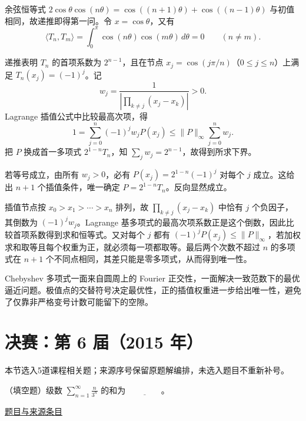 \documentclass[12pt,fontset=fandol]{ctexart}
\begin{document}
\begin{solve}\label{ans:fin05-hi:11}

余弦恒等式
$2\cos\theta\cos(n\theta)=\cos((n+1)\theta)+\cos((n-1)\theta)$
与初值相同，故递推即得第一问。令 $x=\cos\theta$，又有
\[
\langle T_n,T_m\rangle=\int_0^\pi\cos(n\theta)\cos(m\theta)\,d\theta=0
\qquad(n\ne m).
\]

递推表明 $T_n$ 的首项系数为 $2^{n-1}$，且在节点 $x_j=\cos(j\pi/n)$（$0\le j\le n$）上满足 $T_n(x_j)=(-1)^j$。记
\[
w_j=\frac1{\left|\prod_{k\ne j}(x_j-x_k)\right|}>0.
\]
Lagrange 插值公式中比较最高次项，得
\[
1=\sum_{j=0}^n(-1)^jw_jP(x_j)
\le\|P\|_\infty\sum_{j=0}^n w_j.
\]
把 $P$ 换成首一多项式 $2^{1-n}T_n$，知 $\sum_jw_j=2^{n-1}$，故得到所求下界。

若等号成立，由所有 $w_j>0$，必有 $P(x_j)=2^{1-n}(-1)^j$ 对每个 $j$ 成立。这给出 $n+1$ 个插值条件，唯一确定 $P=2^{1-n}T_n$。反向显然成立。

插值节点按 $x_0>x_1>\cdots>x_n$ 排列，故 $\prod_{k\ne j}(x_j-x_k)$ 中恰有 $j$ 个负因子，其倒数为 $(-1)^jw_j$。Lagrange 基多项式的最高次项系数正是这个倒数，因此比较首项系数得到求和恒等式。又对每个 $j$ 都有 $(-1)^jP(x_j)\le\|P\|_\infty$，若加权求和取等且每个权重为正，就必须每一项都取等。最后两个次数不超过 $n$ 的多项式在 $n+1$ 个不同点相同，其差只能是零多项式，从而得到唯一性。

\end{solve}

\begin{remark}[方法与条件]Chebyshev 多项式一面来自圆周上的 Fourier 正交性，一面解决一致范数下的最优逼近问题。极值点的交替符号决定最优性，正的插值权重进一步给出唯一性，避免了仅靠非严格变号计数可能留下的空隙。\end{remark}

\section{决赛：第 6 届（2015 年）}

本节选入5道课程相关题；来源序号保留原题解编排，未选入题目不重新补号。

\begin{example}[来源序号2]\label{ex:fin06-lo:2}\label{pr:fin06-lo:2}

（填空题）级数 $\sum_{n=1}^{\infty}\frac{n}{3^n}$ 的和为 $\underline{\qquad\qquad}$。

\par\href{https://github.com/lzxcr/cmc-mathematics/blob/64916fa1fdbc3e444a652eca204d5669058ee321/src/problems/finals/06/02.md}{题目与来源条目}

\end{example}
\end{document}
